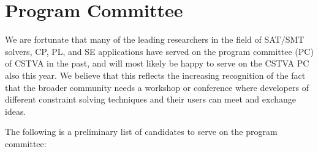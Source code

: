 \documentclass{sig-alternate}
\begin{document}

\section{Program Committee}
We are fortunate that many of the leading researchers in the field of SAT/SMT
solvers, CP, PL, and SE applications have served on the program committee (PC)
of CSTVA in the past, and will most likely be happy to serve on the CSTVA PC
also this year. We believe that this reflects the increasing recognition of the
fact that the broader community needs a workshop or conference where developers
of different constraint solving techniques and their users can meet and
exchange ideas. 

The following is a preliminary list of candidates to serve on the program committee: 
\end{document}

